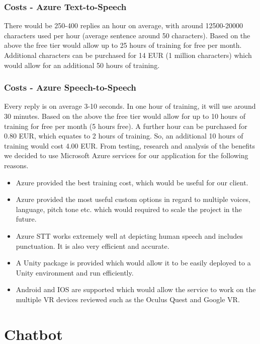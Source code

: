 \subsubsection{Costs - Azure Text-to-Speech}
There would be 250-400 replies an hour on average, with around 12500-20000 characters used per hour (average sentence around 50 characters). Based on the above the free tier would allow up to 25 hours of training for free per month. Additional characters can be purchased for 14 EUR (1 million characters) which would allow for an additional 50 hours of training.

\subsubsection{Costs - Azure Speech-to-Speech}
Every reply is on average 3-10 seconds. In one hour of training, it will use around 30 minutes. Based on the above the free tier would allow for up to 10 hours of training for free per month (5 hours free). A further hour can be purchased for 0.80 EUR, which equates to 2 hours of training. So, an additional 10 hours of training would cost 4.00 EUR.
\newline\newline
From testing, research and analysis of the benefits we decided to use Microsoft Azure services for our application for the following reasons.

\begin{itemize}
  \item Azure provided the best training cost, which would be useful for our client.
  \item Azure provided the most useful custom options in regard to multiple voices, language, pitch tone etc. which would required to scale the project in the future.
  \item Azure STT works extremely well at depicting human speech and includes punctuation. It is also very efficient and accurate.
  \item A Unity package is provided which would allow it to be easily deployed to a Unity environment and run efficiently.
  \item Android and IOS are supported which would allow the service to work on the multiple VR devices reviewed such as the Oculus Quest and Google VR.
\end{itemize}

\section{Chatbot}
